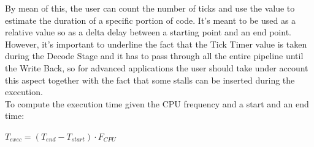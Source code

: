 By mean of this, the user can count the number of ticks and use the value to estimate the duration of a specific portion of code. It's meant to be used as a relative value so as a delta delay between a starting point and an end point.\\

However, it's important to underline the fact that the Tick Timer value is taken during the Decode Stage and it has to pass through all the entire pipeline until the Write Back, so for advanced applications the user should take under account this aspect together with the fact that some stalls can be inserted during the execution. \\ 

To compute the execution time given the CPU frequency and a start and an end time:

\begin{center}
	$ T_{exec} = (T_{end} - T_{start}) \cdot F_{CPU} $
\end{center}
